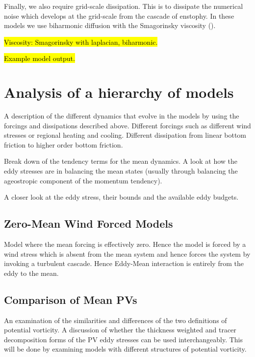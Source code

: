 \documentclass[10pt,a4paper]{report}
\begin{document}
  Finally, we also require grid-scale dissipation. This is to dissipate the
  numerical noise which develops at the grid-scale from the cascade of enstophy.
  In these models we use biharmonic diffusion with the Smagorinsky viscosity (\cite{smagorinsky1963general}).
  
  
  
  
  
\hl{Viscosity: Smagorinsky with laplacian, biharmonic.}


\hl{Example model output.}

\chapter{Analysis of a hierarchy of models}

A description of the different dynamics that evolve
in the models by using the forcings and 
dissipations described above. Different forcings
such as different wind stresses or regional heating
and cooling. Different dissipation from
linear bottom friction to higher order bottom
friction.

Break down of the tendency terms for the mean
dynamics. A look at how the eddy stresses are 
in balancing the mean states (usually through
balancing the ageostropic component of the
momentum tendency).

A closer look at the eddy stress, their bounds 
and the available eddy budgets.

\section{Zero-Mean Wind Forced Models}

Model where the mean forcing is effectively zero. 
Hence the model is forced by a wind stress which is
absent from the mean system and hence forces the
system by 
invoking a turbulent cascade. Hence Eddy-Mean
interaction is entirely from the eddy to the mean.

\section{Comparison of Mean PVs}

An examination of the similarities and differences
of the two definitions of potential vorticity. 
A discussion of whether the thickness
weighted and tracer decomposition forms of the
PV eddy stresses can be used interchangeably.
This will be done by examining models with
different structures of potential vorticity.
\end{document}

